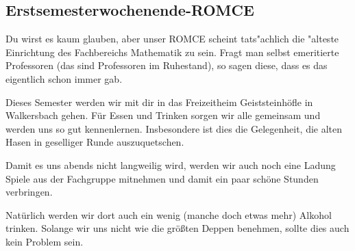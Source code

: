 \subsection{Erstsemesterwochenende-ROMCE}
Du wirst es kaum glauben, aber unser ROMCE scheint tats"achlich die "alteste
Einrichtung des Fachbereichs Mathematik zu sein. Fragt man selbst
emeritierte Professoren (das sind Professoren im Ruhestand), so sagen diese,
dass es das eigentlich schon immer gab.

Dieses Semester werden wir mit dir in das Freizeitheim Geiststeinhöfle
in Walkersbach gehen.
Für Essen und Trinken sorgen wir alle gemeinsam
und werden uns so gut kennenlernen.
Insbesondere ist dies die Gelegenheit, die alten Hasen in geselliger Runde auszuquetschen.

Damit es uns abends nicht langweilig wird, werden wir auch noch eine Ladung Spiele
aus der Fachgruppe mitnehmen
und damit ein paar schöne Stunden verbringen.

Natürlich werden wir dort auch ein wenig (manche doch etwas mehr) Alkohol trinken.
Solange wir uns nicht wie die größten Deppen benehmen, sollte dies auch kein Problem sein.
 

%
%
%
%
%
%
%
%

